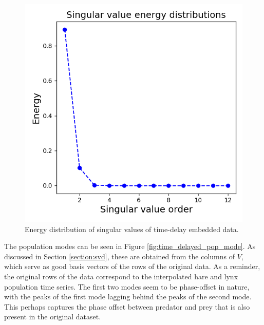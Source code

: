 \documentclass[letterpaper, 10 pt, conference]{ieeeconf}  %
\begin{document}
\begin{figure}[htb] 
\centering
\includegraphics[width=0.97\columnwidth]{images/time_delayed_energy.png}
\caption{Energy distribution of singular values of time-delay embedded data.}
\label{fig:time_delayed_energy}
\end{figure}

The population modes can be seen in Figure \ref{fig:time_delayed_pop_mode}. As discussed in Section \ref{section:svd}, these are obtained from the columns of $V$, which serve as good basis vectors of the rows of the original data. As a reminder, the original rows of the data correspond to the interpolated hare and lynx population time series. The first two modes seem to be phase-offset in nature, with the peaks of the first mode lagging behind the peaks of the second mode. This perhaps captures the phase offset between predator and prey that is also present in the original dataset.
\end{document}
